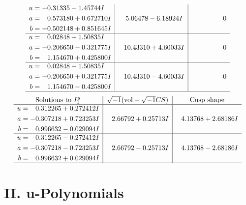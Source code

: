 \documentclass[1p]{elsarticle_modified}
\theoremstyle{definition}
\newcommand{\I}{\sqrt{-1}}
\begin{document}
$$\begin{array}{c|c|c}
\begin{aligned}
u &= -0.31335 - 1.45744 I \\
a &= \phantom{-}0.573180 + 0.672710 I \\
b &= -0.502148 + 0.851645 I\end{aligned}
 & \phantom{-}5.06478 - 6.18924 I & \phantom{-0.000000 } 0 \\ \hline\begin{aligned}
u &= \phantom{-}0.02848 + 1.50835 I \\
a &= -0.206650 - 0.321775 I \\
b &= \phantom{-}1.154670 + 0.425800 I\end{aligned}
 & \phantom{-}10.43310 + 4.60033 I & \phantom{-0.000000 } 0 \\ \hline\begin{aligned}
u &= \phantom{-}0.02848 - 1.50835 I \\
a &= -0.206650 + 0.321775 I \\
b &= \phantom{-}1.154670 - 0.425800 I\end{aligned}
 & \phantom{-}10.43310 - 4.60033 I & \phantom{-0.000000 } 0\\
 \hline 
 \end{array}$$\newpage$$\begin{array}{c|c|c}  
\text{Solutions to }I^u_{1}& \I (\text{vol} + \sqrt{-1}CS) & \text{Cusp shape}\\
 \hline 
\begin{aligned}
u &= \phantom{-}0.312265 + 0.272412 I \\
a &= -0.307218 + 0.723253 I \\
b &= \phantom{-}0.996632 - 0.029094 I\end{aligned}
 & \phantom{-}2.66792 + 0.25713 I & \phantom{-}4.13768 + 2.68186 I \\ \hline\begin{aligned}
u &= \phantom{-}0.312265 - 0.272412 I \\
a &= -0.307218 - 0.723253 I \\
b &= \phantom{-}0.996632 + 0.029094 I\end{aligned}
 & \phantom{-}2.66792 - 0.25713 I & \phantom{-}4.13768 - 2.68186 I\\
 \hline 
 \end{array}$$\newpage
\newpage\renewcommand{\arraystretch}{1}
\centering \section*{ II. u-Polynomials}
\end{document}
